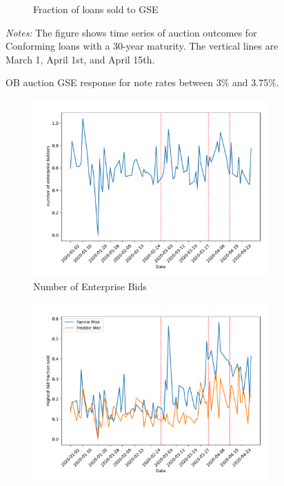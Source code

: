 \documentclass[11pt,a4paper]{article}
\begin{document}
\begin{figure}[h]
\begin{subfigure}[b]{0.49\textwidth}
      \caption{ Fraction of loans sold to GSE}
     \end{subfigure}
     \caption{OB auction  GSE response for note rates between 3\% and 3.75\%. } 
   \begin{minipage}{\textwidth}
      \footnotesize{\textit{Notes:} The figure shows time series of auction outcomes for Conforming loans with a 30-year maturity. The vertical lines are March 1, April 1st, and April 15th.  } 
      \end{minipage}
\end{figure}

\begin{figure}[h]
  \centering
  \begin{subfigure}[b]{0.49\textwidth}
      \includegraphics[width=0.998\textwidth]{../results/figures/Number of Enterprise Bidders_mean_mat30_loan1_timeseries_nr_4_4.75.pdf}
      \caption{Number of Enterprise Bids}
     \end{subfigure}
     \begin{subfigure}[b]{0.49\textwidth}
      \includegraphics[width=0.998\textwidth]{../results/figures/sold_FreddieBid_mean_mat30_loan1_timeseries_nr_4_4.75.pdf}

\end{subfigure}
\end{figure}
\end{document}
